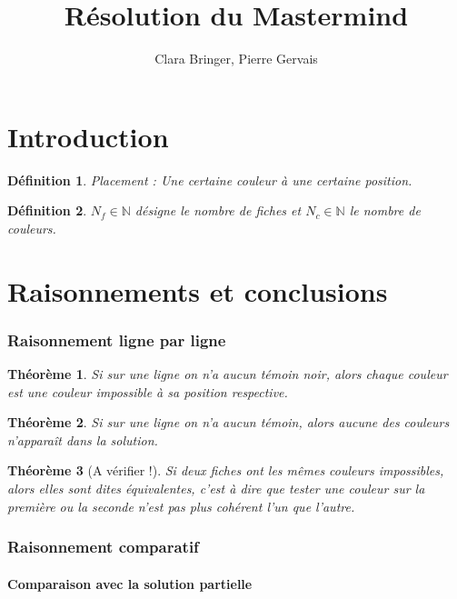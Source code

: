 \documentclass[]{article}
\title{Résolution du Mastermind}
\author{Clara Bringer, Pierre Gervais}
\newtheorem{mydef}{Définition}
\newtheorem{mythm}{Théorème}
\begin{document}
\maketitle

\part*{Introduction}

\begin{mydef}
	Placement : Une certaine couleur à une certaine position.
\end{mydef}

\begin{mydef}
	$N_f \in \mathbb{N}$ désigne le nombre de fiches et $N_c \in \mathbb{N}$ le nombre de couleurs.
\end{mydef}

\part*{Raisonnements et conclusions}

\section{Raisonnement ligne par ligne}

\begin{mythm}
Si sur une ligne on n'a aucun témoin noir, alors chaque couleur est une couleur impossible à sa position respective.
\end{mythm}

\begin{mythm}
	Si sur une ligne on n'a aucun témoin, alors aucune des couleurs n'apparaît dans la solution.
\end{mythm}

\begin{mythm}[A vérifier !]
	Si deux fiches ont les mêmes couleurs impossibles, alors elles sont dites équivalentes, c'est à dire que tester une couleur sur la première ou la seconde n'est pas plus cohérent l'un que l'autre.
\end{mythm}

\section{Raisonnement comparatif}

\subsection{Comparaison avec la solution partielle}
\end{document}
